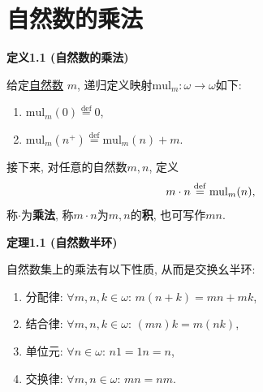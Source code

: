 


\setlength{\abovedisplayskip}{1pt}
\setlength{\belowdisplayskip}{1pt}

\section{自然数的乘法}

\hypertarget{sec:定义1.1}{}
\noindent\textbf{定义1.1 (自然数的乘法)}

给定\href{../01 自然数/01 自然数#nameddest=sec:定义1.3}{自然数} $m$,
递归定义映射$\mathrm{mul}_m:\omega\to\omega$如下:
\begin{enumerate}
    \item $\mathrm{mul}_m(0)\overset{\mathrm{def}}{=}0$,
    \item $\mathrm{mul}_m(n^+)\overset{\mathrm{def}}{=}\mathrm{mul}_m(n)+m$.
\end{enumerate}

接下来, 对任意的自然数$m,n$, 定义
\[
    m\cdot n\overset{\mathrm{def}}{=}\mathrm{mul}_m(n),\\[-3pt]
\]
称$\cdot$为\textbf{乘法}, 称$m\cdot n$为$m,n$的\textbf{积}, 也可写作$mn$.

\vspace{10pt}

\hypertarget{sec:定理1.1}{}
\noindent\textbf{定理1.1 (自然数半环)}

自然数集上的乘法有以下性质, 从而是交换幺半环:
\begin{enumerate}
    \item 分配律: $\forall m,n,k\in\omega:\,m(n+k)=mn+mk$,
    \item 结合律: $\forall m,n,k\in\omega:\,(mn)k=m(nk)$,
    \item 单位元: $\forall n\in\omega:\,n1=1n=n$,
    \item 交换律: $\forall m,n\in\omega:\,mn=nm$.
\end{enumerate}


